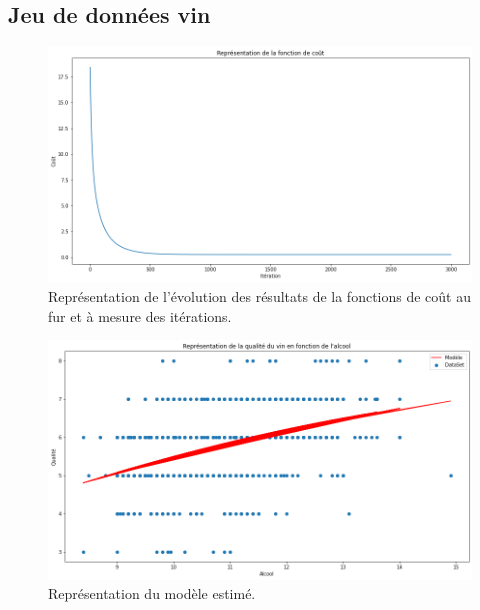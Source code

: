 \documentclass[french]{article}
\begin{document}

\subsection{Jeu de données vin}

\begin{figure}[!htbp]
    \centering
    \includegraphics[width=\textwidth]{Rapport/images/cout_MLP2.png}
    \caption{Représentation de l'évolution des résultats de la fonctions de coût au fur et à mesure des itérations.}
    \label{fig:cout_MLP2}
\end{figure}

\begin{figure}[!htbp]
    \centering
    \includegraphics[width=\textwidth]{Rapport/images/modele_MLP2.png}
    \caption{Représentation du modèle estimé.}
    \label{fig:modele_mlp2}
\end{figure}
\end{document}
